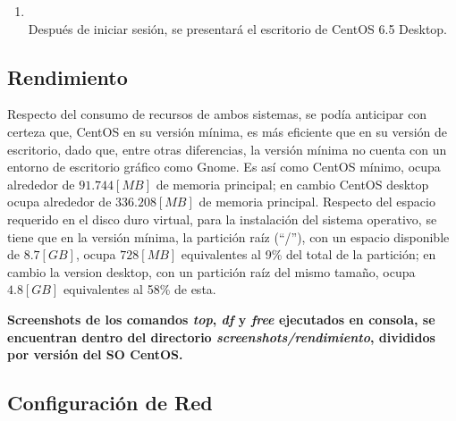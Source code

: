 \documentclass[11pt]{article}
\begin{document}
\begin{enumerate}
	        \item
	        	\begin{minipage}[t]{\linewidth}
			        \raggedright
			        \medskip
			        \\Después de iniciar sesión, se presentará el escritorio de CentOS 6.5 Desktop.
		        \end{minipage}
		    
		    \end{enumerate}

		    
\subsection{Rendimiento}
Respecto del consumo de recursos de ambos sistemas, se podía anticipar con certeza que, CentOS en su versión mínima, es más eficiente que en su versión de escritorio, dado que, entre otras diferencias, la versión mínima no cuenta con un entorno de escritorio gráfico como Gnome. Es así como CentOS mínimo, ocupa alrededor de $91.744 [MB]$ de memoria principal; en cambio CentOS desktop ocupa alrededor de $336.208 [MB]$ de memoria principal. Respecto del espacio requerido en el disco duro virtual, para la instalación del sistema operativo, se tiene que en la versión mínima, la partición raíz (``/''), con un espacio disponible de $8.7 [GB]$, ocupa $728 [MB]$ equivalentes al 9\% del total de la partición; en cambio la version desktop, con un partición raíz del mismo tamaño, ocupa $4.8 [GB]$ equivalentes al 58\% de esta.  

\textbf{Screenshots de los comandos \textit{top}, \textit{df} y \textit{free} ejecutados en consola, se encuentran dentro del directorio \textit{screenshots/rendimiento}, divididos por versión del SO CentOS.}


\subsection{Configuración de Red}
\end{document}
